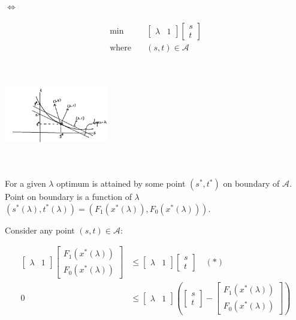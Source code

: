 $\Leftrightarrow$

\begin{align*}
\min \quad&\begin{bmatrix}
\lambda &1 
\end{bmatrix}\begin{bmatrix}
s\\
t
\end{bmatrix}\\
\text{where} \quad &(s,t) \in \mathcal{A}
\end{align*}

\begin{marginfigure}
\centering
\includegraphics[width=1.8in,height=1.8in]{figures/ch10/figure1125_3.png}
\end{marginfigure}

For a given $\lambda$ optimum is attained by some point $(s^*, t^*)$ on boundary of $\mathcal{A}$. Point on boundary is a function of $\lambda$ $(s^*(\lambda), t^*(\lambda)) = (F_1(x^*(\lambda)), F_0(x^*(\lambda)))$. 

Consider any point $(s,t)\in \mathcal{A}$:

\begin{align*}
\begin{bmatrix}
\lambda &1
\end{bmatrix}\begin{bmatrix}
F_1(x^*(\lambda))\\
F_0(x^*(\lambda))
\end{bmatrix}&\leq \begin{bmatrix}
\lambda &1
\end{bmatrix}\begin{bmatrix}
s\\
t
\end{bmatrix}\quad  (*)\\
0&\leq \begin{bmatrix}
\lambda & 1
\end{bmatrix}(\begin{bmatrix}
s\\
t
\end{bmatrix} - \begin{bmatrix}
F_1(x^*(\lambda))\\
F_0(x^*(\lambda))
\end{bmatrix})
\end{align*}

